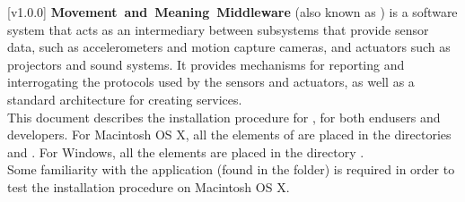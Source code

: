 [v1.0.0]
\textbf{Movement~and~Meaning~Middleware} (also known as \mplusm) is a software system
that acts as an intermediary between subsystems that provide sensor data, such as
accelerometers and motion capture cameras, and actuators such as projectors and sound
systems.
It provides mechanisms for reporting and interrogating the protocols used by the sensors
and actuators, as well as a standard architecture for creating services.\\

This document describes the installation procedure for \mplusm, for both
end\longDash{}users and developers.
For Macintosh OS X, all the elements of \mplusm{} are placed in the directories
 and .
For Windows, all the elements are placed in the directory
.\\

Some familiarity with the  application (found in the
 folder) is required in order to test the installation
procedure on Macintosh OS X.
\primaryEnd{}
